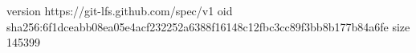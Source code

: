 version https://git-lfs.github.com/spec/v1
oid sha256:6f1dceabb08ea05e4acf232252a6388f16148c12fbc3cc89f3bb8b177b84a6fe
size 145399
